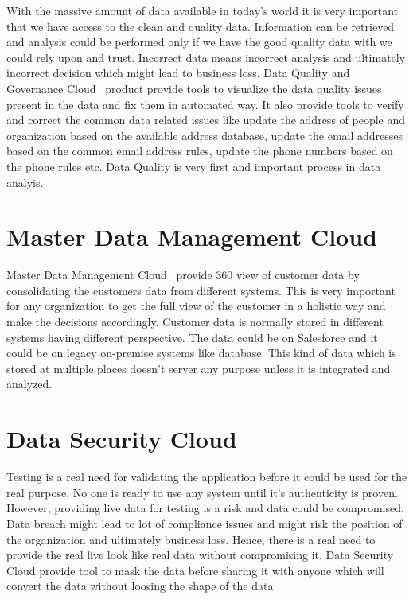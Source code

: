 With the massive amount of data available in today's world it is very
important that we have access to the clean and quality data. Information can be
retrieved and analysis could be performed only if we have the good
quality data with we could rely upon and trust. Incorrect data means incorrect analysis and ultimately incorrect decision which might lead to business loss. Data Quality and
Governance Cloud~\cite{hid-sp18-511-iics} product provide tools to
visualize the data quality issues present in the data and fix them in automated way. It
also provide tools to verify and correct the common data related
issues like update the address of people and organization based on the
available address database, update the email addresses based on the
common email address rules, update the phone numbers based on the phone rules etc. Data Quality is very first and important process in data analyis.

\section{Master Data Management Cloud}
Master Data Management Cloud~\cite{hid-sp18-511-iics} provide 360 view
of customer data by consolidating the customers data from different
systems. This is very important for any organization to get the full view of the customer in a holistic way and make the decisions accordingly. Customer data is normally stored in different systems having different perspective. The data could be on Salesforce\cite{hid-sp18-511-salesforce} and it could be on legacy on-premise systems like database. This kind of data which is stored at multiple places doesn't server any purpose unless it is integrated and analyzed.

\section{Data Security Cloud}
Testing is a real need for validating the application before it could be used for the real purpose. No one is ready to use any system until it's authenticity is proven. However, providing
live data for testing is a risk and data could be
compromised. Data breach might lead to lot of compliance issues and might risk the position of the organization and ultimately business loss. Hence, there is a real need to provide the real live look like real data without compromising it. Data Security Cloud\cite{hid-sp18-511-iics}
provide tool to mask the data before sharing it with anyone which
will convert the data without loosing the shape of the data

